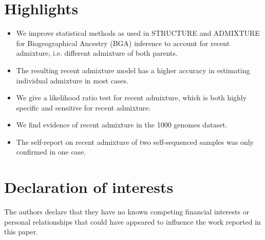 \documentclass[12pt]{article}
\theoremstyle{definition}
\begin{document}
\section*{Highlights}
\begin{itemize}
    \item We improve statistical methods as used in {\sc STRUCTURE} and {\sc ADMIXTURE} for Biogeographical Ancestry (BGA) inference to account for recent admixture, i.e. different admixture of both parents.
    \item The resulting recent admixture model has a higher accuracy in estimating individual admixture in most cases. 
    \item We give a likelihood ratio test for recent admixture, which is both highly specific and sensitive for recent admixture.
    \item We find evidence of recent admixture in the 1000 genomes dataset.
    \item The self-report on recent admixture of two self-sequenced samples was {\color{blue} only confirmed in one case.}
    \end{itemize}


\newpage

\thispagestyle{empty}
\section*{Declaration of interests}
 The authors declare that they have no known competing financial interests or personal relationships that could have appeared to influence the work reported in this paper.
\end{document}
